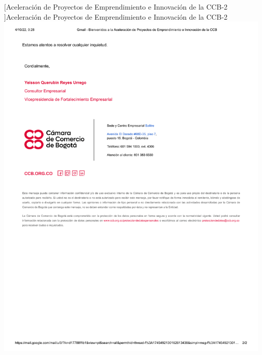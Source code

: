 \vspace{2mm}
        \begin{minipage}{0.9\textwidth}
        \centering
        [{Aceleración de Proyectos de Emprendimiento e Innovación de la CCB-2 }]{Aceleración de Proyectos de Emprendimiento e Innovación de la CCB-2 }
        \label{convocatoria1}
         \includegraphics[width=1\textwidth]{Images/Gmail - Bienvenidos a la Aceleración de Proyectos de Emprendimiento e Innovación de la CCB-2.png}
\end{minipage}